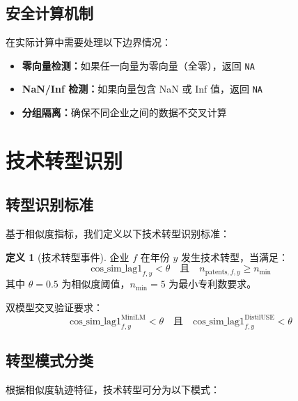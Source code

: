 \documentclass[12pt,a4paper]{article}
\theoremstyle{definition}
\newtheorem{definition}{定义}[section]
\begin{document}
\subsection{安全计算机制}

在实际计算中需要处理以下边界情况：

\begin{itemize}
    \item \textbf{零向量检测：}如果任一向量为零向量（全零），返回 \texttt{NA}
    \item \textbf{NaN/Inf 检测：}如果向量包含 NaN 或 Inf 值，返回 \texttt{NA}
    \item \textbf{分组隔离：}确保不同企业之间的数据不交叉计算
\end{itemize}

\section{技术转型识别}

\subsection{转型识别标准}

基于相似度指标，我们定义以下技术转型识别标准：

\begin{definition}[技术转型事件]
企业 $f$ 在年份 $y$ 发生技术转型，当满足：
\begin{equation}
    \text{cos\_sim\_lag1}_{f,y} < \theta \quad \text{且} \quad n_{\text{patents},f,y} \geq n_{\min}
\end{equation}
其中 $\theta = 0.5$ 为相似度阈值，$n_{\min} = 5$ 为最小专利数要求。
\end{definition}

双模型交叉验证要求：
\begin{equation}
    \text{cos\_sim\_lag1}_{f,y}^{\text{MiniLM}} < \theta \quad \text{且} \quad \text{cos\_sim\_lag1}_{f,y}^{\text{DistilUSE}} < \theta
\end{equation}

\subsection{转型模式分类}

根据相似度轨迹特征，技术转型可分为以下模式：
\end{document}
